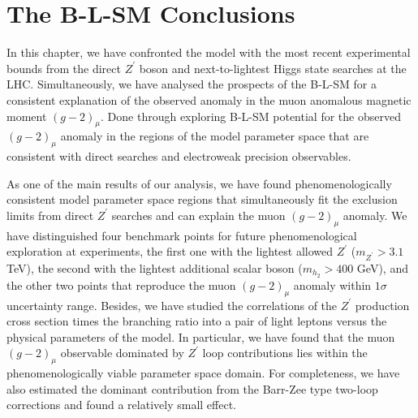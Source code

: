 \section{The B-L-SM Conclusions}
\label{sec:Conclusions BLSM}


In this chapter, we have confronted the model with the most recent experimental bounds from the direct $Z^\prime$ boson and next-to-lightest Higgs state searches at the LHC.
%
Simultaneously, we have analysed the prospects of the B-L-SM for a consistent explanation of the observed anomaly in the muon anomalous magnetic moment $(g-2)_{\mu}$. 
%
Done through exploring B-L-SM potential for the observed $(g-2)_{\mu}$ anomaly in the regions of the model parameter space that are consistent with direct searches and electroweak precision observables.

As one of the main results of our analysis, we have found phenomenologically consistent model parameter space regions that simultaneously fit the exclusion limits from direct $Z^\prime$ searches and can explain the muon $(g-2)_{\mu}$ anomaly. 
%
We have distinguished four benchmark points for future phenomenological exploration at experiments, the first one with the lightest allowed $Z^\prime$ ($m_{Z^\prime}>3.1$ TeV), the second with the lightest additional scalar boson ($m_{h_2}>400$ GeV), and the other two points that reproduce the muon $(g-2)_{\mu}$ anomaly within $1\sigma$ uncertainty range. 
%
Besides, we have studied the correlations of the $Z^\prime$ production cross section times the branching ratio into a pair of light leptons versus the physical parameters of the model.
%
In particular, we have found that the muon $(g-2)_{\mu}$ observable dominated by $Z^\prime$ loop contributions lies within the phenomenologically viable parameter space domain. 
%
{ \color{gray} For completeness, we have also estimated the dominant contribution from the Barr-Zee type two-loop corrections and found a relatively small effect. } 


